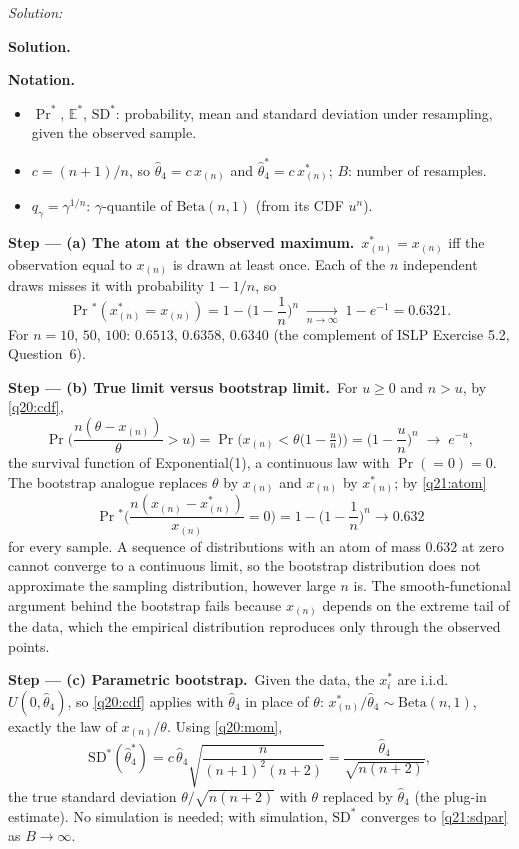 \documentclass[11pt,a4paper]{article}
\newif\ifsolucoes
\newcommand{\espacoresol}{4.5cm}   %
\numberwithin{equation}{questao}   %
\newenvironment{notacao}{\par\smallskip\noindent\textbf{Notation.}\begin{itemize}[leftmargin=1.4em,topsep=1pt,itemsep=0pt]\small}{\end{itemize}}
\newcommand{\resolespaco}{\ifsolucoes\else\par\textit{Solution:}\vspace{\espacoresol}\par\fi}
\newcommand{\passo}[2]{\par\smallskip\noindent\textbf{Step --- #1.}~#2}
\newcommand{\solhead}{\par\medskip\noindent{\color{blue!55!black}\rule{\linewidth}{0.3pt}}\par\noindent\textbf{Solution.}}
\newcommand{\E}{\mathbb{E}}
\begin{document}
\resolespaco
\begin{sol}
\solhead
\begin{notacao}
\item $\Pr^*$, $\E^*$, $\mathrm{SD}^*$: probability, mean and standard deviation under resampling, given
  the observed sample.
\item $c=(n+1)/n$, so $\hat\theta_4=c\,x_{(n)}$ and $\hat\theta_4^*=c\,x^*_{(n)}$; $B$: number of resamples.
\item $q_\gamma=\gamma^{1/n}$: $\gamma$-quantile of $\mathrm{Beta}(n,1)$ (from its CDF $u^n$).
\end{notacao}

\passo{(a) The atom at the observed maximum}{$x^*_{(n)}=x_{(n)}$ iff the observation equal to
$x_{(n)}$ is drawn at least once. Each of the $n$ independent draws misses it with probability
$1-1/n$, so}
\begin{equation}\label{q21:atom}
\Pr{}^*(x^*_{(n)}=x_{(n)})=1-\Big(1-\frac1n\Big)^n\;\xrightarrow[n\to\infty]{}\;1-e^{-1}=0.6321 .
\end{equation}
For $n=10$, $50$, $100$: $0.6513$, $0.6358$, $0.6340$ (the complement of ISLP Exercise 5.2,
Question~6).

\passo{(b) True limit versus bootstrap limit}{For $u\ge0$ and $n>u$, by \eqref{q20:cdf},}
\begin{equation}\label{q21:exp}
\Pr\Big(\frac{n(\theta-x_{(n)})}{\theta}>u\Big)=\Pr\Big(x_{(n)}<\theta\big(1-\tfrac un\big)\Big)
=\Big(1-\frac un\Big)^n\;\longrightarrow\;e^{-u},
\end{equation}
the survival function of Exponential(1), a continuous law with $\Pr(=0)=0$. The bootstrap analogue
replaces $\theta$ by $x_{(n)}$ and $x_{(n)}$ by $x^*_{(n)}$; by \eqref{q21:atom}
\[
\Pr{}^*\Big(\frac{n(x_{(n)}-x^*_{(n)})}{x_{(n)}}=0\Big)=1-\Big(1-\frac1n\Big)^n\to0.632
\]
for every sample. A sequence of distributions with an atom of mass $0.632$ at zero cannot converge to
a continuous limit, so the bootstrap distribution does not approximate the sampling distribution, however
large $n$ is. The smooth-functional argument behind the bootstrap fails because $x_{(n)}$ depends on
the extreme tail of the data, which the empirical distribution reproduces only through the observed
points.

\passo{(c) Parametric bootstrap}{Given the data, the $x_i^*$ are i.i.d.\ $U(0,\hat\theta_4)$, so
\eqref{q20:cdf} applies with $\hat\theta_4$ in place of $\theta$: $x^*_{(n)}/\hat\theta_4\sim\mathrm{Beta}(n,1)$,
exactly the law of $x_{(n)}/\theta$. Using \eqref{q20:mom},}
\begin{equation}\label{q21:sdpar}
\mathrm{SD}^*(\hat\theta_4^*)=c\,\hat\theta_4\sqrt{\frac{n}{(n+1)^2(n+2)}}=\frac{\hat\theta_4}{\sqrt{n(n+2)}} ,
\end{equation}
the true standard deviation $\theta/\sqrt{n(n+2)}$ with $\theta$ replaced by $\hat\theta_4$ (the plug-in
estimate). No simulation is needed; with simulation, $\mathrm{SD}^*$ converges to \eqref{q21:sdpar} as
$B\to\infty$.


\end{sol}
\end{document}

